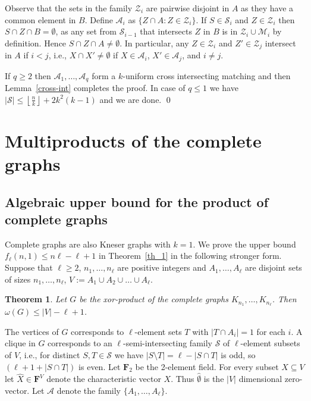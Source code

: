\documentclass[12pt,a4paper]{amsart}
\numberwithin{equation}{section}
\theoremstyle{plain}
\newtheorem{Th}{Theorem}[section]
\theoremstyle{definition}
\newcommand{\m}{\mathcal}
\newcommand{\trivup}{\left\lfloor\frac{n}{k}\right\rfloor}
\newcommand{\NN}{n}
\def\vec#1{\widehat{#1}}
\def\bbF{{\mathbf F}}
\def\cA{{\mathcal{A}}}
\def\cS{{\mathcal{S}}}
\begin{document}
Observe that  the sets in the family $\mathcal{Z}_{i}$ are pairwise disjoint in $A$ as they have a common element in $B$.
Define $\cA_i$ as $\{ Z\cap A: Z\in \m{Z}_i \}$.
If $S \in \m{S}_{i}$ and $Z \in \mathcal{Z}_{i}$ then $S\cap Z\cap B=\emptyset$, as any set from $\m{S}_{i-1}$ that intersects $Z$ in $B$ is in $\m{Z}_i \cup \m{M}_i$ by definition. Hence $S \cap Z\cap A\neq \emptyset$. In particular, any $Z \in \m{Z}_i$ and $Z' \in \m{Z}_j$ intersect in $A$ if $i < j$, i.e., $X\cap X'\neq \emptyset$ if $X\in \cA_i$, $X'\in \cA_j$, and $i \neq j$.

If $q\geq 2$ then $\cA_1, \dots, \cA_{q} $ form a $k$-uniform cross intersecting matching and then Lemma~\ref{cross-int} completes the proof. In case of $q\leq 1$ we have $|\m{S}| \leq \trivup + 2k^2(k-1)$ and we are done. \qed




\section{Multiproducts of the complete graphs} \label{sec_k1}



\subsection{Algebraic upper bound for the product of complete graphs}\label{ss:completes_upper}

Complete graphs are also Kneser graphs with $k=1$.
We prove the upper bound  $f_\ell(\NN,1)\leq \NN \ell-\ell+1$ in Theorem~\ref{th_1} in the following stronger form.
Suppose that $\ell\geq 2$, $n_1, \dots, n_\ell$ are positive integers and $A_1, \dots, A_\ell$ are disjoint sets
 of sizes $n_1, \dots, n_\ell$, $V:=A_1 \cup A_2 \cup \ldots \cup A_\ell $.

\begin{Th}\label{th_1_upper}
Let $G$ be the xor-product of the complete graphs $K_{n_1}, \dots, K_{n_\ell}$.
Then $\omega(G)\leq |V|-\ell+1$.
\end{Th}


The vertices of $G$ corresponds to $\ell$-element sets $T$ with $|T\cap A_i|=1$ for each $i$.
A clique in $G$ corresponds to an $\ell$-semi-intersecting family $\cS$ of $\ell$-element subsets of $V$, i.e.,
 for distinct $S,T\in \cS$ we have $|S\setminus T|= \ell-|S\cap T|$ is odd, so $(\ell+1+ |S\cap T|)$ is even.
Let $\bbF_2$ be the 2-element field.
For every subset $X\subseteq V$ let $\vec X \in \bbF^V$ denote the characteristic vector $X$. Thus $\vec \emptyset $ is the $|V|$ dimensional zero-vector.
Let $\cA$ denote the family $\{ A_1, \dots, A_\ell \}$.
\end{document}
